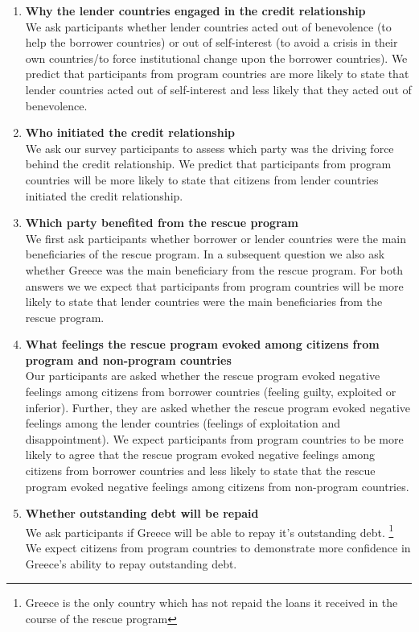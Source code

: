 \begin{enumerate} 
\item\textbf{Why the lender countries engaged in the credit relationship} \\
We ask participants whether lender countries acted out of benevolence (to help the borrower countries) or out of self-interest (to avoid a crisis in their own countries/to force institutional change upon the borrower countries). We predict that participants from program countries are more likely to state that lender countries acted out of self-interest and less likely that they acted out of benevolence. 

\item \textbf{Who initiated the credit relationship} \\
We ask our survey participants to assess which party was the driving force behind the credit relationship. We predict that participants from program countries will be more likely to state that citizens from lender countries initiated the credit relationship. 

\item \textbf{Which party benefited from the rescue program}\\ 
We first ask participants whether borrower or lender countries were the main beneficiaries of the rescue program. In a subsequent question we also ask whether Greece was the main beneficiary from the rescue program. For both answers we we expect that participants from program countries will be more likely to state that lender countries were the main beneficiaries from the rescue program. 

\item \textbf{ What feelings the rescue program evoked among citizens from program and non-program countries}\\
Our participants are asked whether the rescue program evoked negative feelings among citizens from borrower countries (feeling guilty, exploited or inferior). Further, they are asked whether the rescue program evoked negative feelings among the lender countries (feelings of exploitation and disappointment).  
We expect participants from program countries to be more likely to agree that the rescue program evoked negative feelings among citizens from borrower countries and less likely to state that the rescue program evoked negative feelings among citizens from non-program countries. 
\item \textbf{Whether outstanding debt will be repaid} \\
We ask participants if Greece will be able to repay it's outstanding debt. \footnote{Greece is the only country which has not repaid the loans it received in the course of the rescue program} We expect citizens from program countries to demonstrate more confidence in Greece's ability to repay outstanding debt. 
\end{enumerate}
